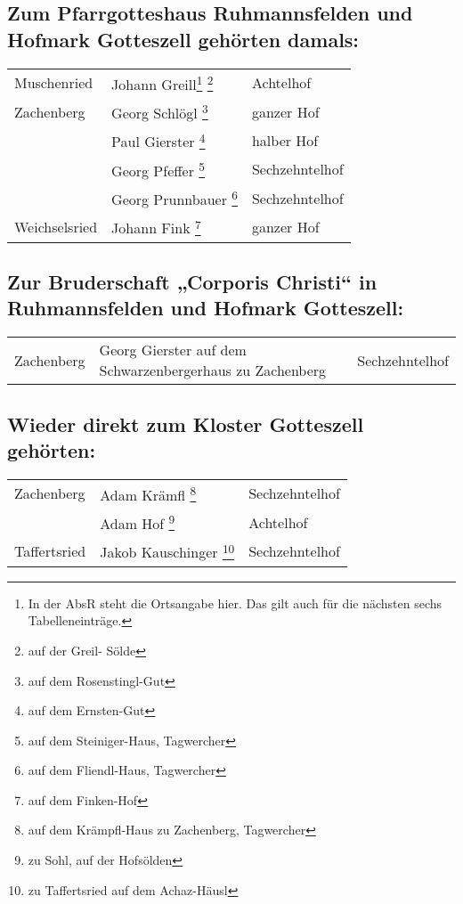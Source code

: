 \documentclass{book}
\begin{document}
\subsection{Zum Pfarrgotteshaus Ruhmannsfelden und Hofmark Gotteszell
gehörten damals:}

\begin{longtable}{l|l|l}
Muschenried & Johann Greill\footnote{In der AbsR steht die Ortsangabe
hier. Das gilt auch für die nächsten sechs Tabelleneinträge.}
\footnote{auf der Greil- Sölde} & Achtelhof\\

Zachenberg & Georg Schlögl \footnote{auf dem Rosenstingl-Gut} & ganzer
Hof\\

& Paul Gierster \footnote{auf dem Ernsten-Gut} & halber Hof\\

& Georg Pfeffer \footnote{auf dem Steiniger-Haus, Tagwercher} &
Sechzehntelhof\\

& Georg Prunnbauer \footnote{auf dem Fliendl-Haus, Tagwercher} &
Sechzehntelhof\\

Weichselsried & Johann Fink \footnote{auf dem Finken-Hof} & ganzer Hof\\

\end{longtable}

\subsection{Zur Bruderschaft „Corporis Christi“ in Ruhmannsfelden und
Hofmark Gotteszell:}

\begin{longtable}{l|l|l}
Zachenberg & Georg Gierster auf dem Schwarzenbergerhaus zu Zachenberg &
Sechzehntelhof\\
\end{longtable}

\subsection{Wieder direkt zum Kloster Gotteszell gehörten:}

\begin{longtable}{l|l|l}
Zachenberg & Adam Krämfl \footnote{auf dem Krämpfl-Haus zu Zachenberg,
Tagwercher} & Sechzehntelhof\\

& Adam Hof \footnote{zu Sohl, auf der Hofsölden} & Achtelhof\\

Taffertsried & Jakob Kauschinger \footnote{zu Taffertsried auf dem
Achaz-Häusl} & Sechzehntelhof\\
\end{longtable}
\end{document}
